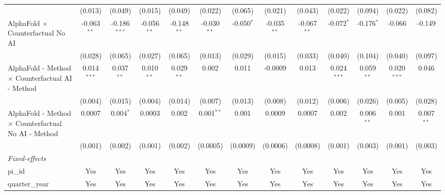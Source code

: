 \begin{tabular}{lcccccccccccc}
                                                              & (0.013)        & (0.049)        & (0.015)        & (0.049)        & (0.022)        & (0.065)       & (0.021)        & (0.043)       & (0.022)        & (0.094)        & (0.022)        & (0.082)\\   
   AlphaFold $\times$ Counterfactual No AI                    & -0.063$^{**}$  & -0.186$^{***}$ & -0.056$^{**}$  & -0.148$^{**}$  & -0.030$^{**}$  & -0.050$^{*}$  & -0.035$^{**}$  & -0.067$^{**}$ & -0.072$^{*}$   & -0.176$^{*}$   & -0.066         & -0.149\\   
                                                              & (0.028)        & (0.065)        & (0.027)        & (0.065)        & (0.013)        & (0.029)       & (0.015)        & (0.033)       & (0.040)        & (0.104)        & (0.040)        & (0.097)\\   
   AlphaFold - Method $\times$ Counterfactual AI - Method     & 0.014$^{***}$  & 0.037$^{**}$   & 0.010$^{**}$   & 0.029$^{**}$   & 0.002          & 0.011         & -0.0009        & 0.013         & 0.024$^{***}$  & 0.059$^{**}$   & 0.020$^{***}$  & 0.046\\   
                                                              & (0.004)        & (0.015)        & (0.004)        & (0.014)        & (0.007)        & (0.013)       & (0.008)        & (0.012)       & (0.006)        & (0.026)        & (0.005)        & (0.028)\\   
   AlphaFold - Method $\times$ Counterfactual No AI - Method  & 0.0007         & 0.004$^{*}$    & 0.0003         & 0.002          & 0.001$^{**}$   & 0.001         & 0.0009         & 0.0007        & 0.002          & 0.006$^{**}$   & 0.001          & 0.007$^{**}$\\   
                                                              & (0.001)        & (0.002)        & (0.001)        & (0.002)        & (0.0005)       & (0.0009)      & (0.0006)       & (0.0008)      & (0.001)        & (0.003)        & (0.001)        & (0.003)\\   
   \midrule
   \emph{Fixed-effects}\\
   pi\_id                                                     & Yes            & Yes            & Yes            & Yes            & Yes            & Yes           & Yes            & Yes           & Yes            & Yes            & Yes            & Yes\\  
   quarter\_year                                              & Yes            & Yes            & Yes            & Yes            & Yes            & Yes           & Yes            & Yes           & Yes            & Yes            & Yes            & Yes\\  

\end{tabular}

